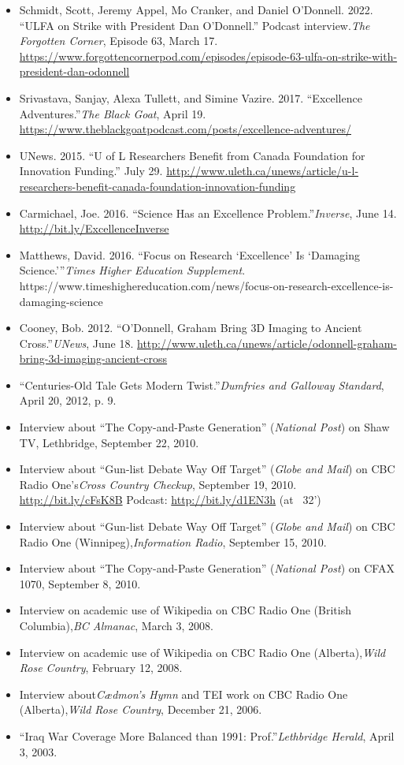 \documentclass[12pt]{article}
\begin{document}
\begin{itemize}
  \item Schmidt, Scott, Jeremy Appel, Mo Cranker, and Daniel O’Donnell. 2022. “ULFA on Strike with President Dan O’Donnell.” Podcast interview.\textit{The Forgotten Corner}, Episode 63, March 17. \url{https://www.forgottencornerpod.com/episodes/episode-63-ulfa-on-strike-with-president-dan-odonnell}
  \item Srivastava, Sanjay, Alexa Tullett, and Simine Vazire. 2017. “Excellence Adventures.”\textit{The Black Goat}, April 19. \url{https://www.theblackgoatpodcast.com/posts/excellence-adventures/}
  \item UNews. 2015. “U of L Researchers Benefit from Canada Foundation for Innovation Funding.” July 29. \url{http://www.uleth.ca/unews/article/u-l-researchers-benefit-canada-foundation-innovation-funding}
  \item Carmichael, Joe. 2016. “Science Has an Excellence Problem.”\textit{Inverse}, June 14. \url{http://bit.ly/ExcellenceInverse}
  \item Matthews, David. 2016. “Focus on Research ‘Excellence’ Is ‘Damaging Science.’”\textit{Times Higher Education Supplement}. https://www.timeshighereducation.com/news/focus-on-research-excellence-is-damaging-science
  \item Cooney, Bob. 2012. “O’Donnell, Graham Bring 3D Imaging to Ancient Cross.”\textit{UNews}, June 18. \url{http://www.uleth.ca/unews/article/odonnell-graham-bring-3d-imaging-ancient-cross}
  \item “Centuries-Old Tale Gets Modern Twist.”\textit{Dumfries and Galloway Standard}, April 20, 2012, p. 9.
  \item Interview about “The Copy-and-Paste Generation” (\textit{National Post}) on Shaw TV, Lethbridge, September 22, 2010.
  \item Interview about “Gun-list Debate Way Off Target” (\textit{Globe and Mail}) on CBC Radio One’s\textit{Cross Country Checkup}, September 19, 2010. \url{http://bit.ly/cFsK8B} Podcast: \url{http://bit.ly/d1EN3h} (at ~32')
  \item Interview about “Gun-list Debate Way Off Target” (\textit{Globe and Mail}) on CBC Radio One (Winnipeg),\textit{Information Radio}, September 15, 2010.
  \item Interview about “The Copy-and-Paste Generation” (\textit{National Post}) on CFAX 1070, September 8, 2010.
  \item Interview on academic use of Wikipedia on CBC Radio One (British Columbia),\textit{BC Almanac}, March 3, 2008.
  \item Interview on academic use of Wikipedia on CBC Radio One (Alberta),\textit{Wild Rose Country}, February 12, 2008.
  \item Interview about\textit{Cædmon’s Hymn} and TEI work on CBC Radio One (Alberta),\textit{Wild Rose Country}, December 21, 2006.
  \item “Iraq War Coverage More Balanced than 1991: Prof.”\textit{Lethbridge Herald}, April 3, 2003.
\end{itemize}
\end{document}
